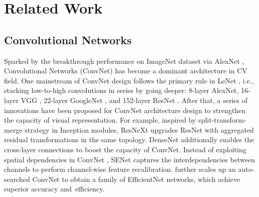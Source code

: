 \documentclass[10pt,twocolumn,letterpaper]{article}
\begin{document}
\section{Related Work}

\subsection{Convolutional Networks} Sparked by the breakthrough performance on ImageNet dataset via AlexNet \cite{krizhevsky2012imagenet}, Convolutional Networks (ConvNet) has become a dominant architecture in CV field. One mainstream of ConvNet design follows the primary rule in LeNet \cite{lecun1998gradient}, i.e., stacking low-to-high convolutions in series by going deeper: 8-layer AlexNet, 16-layer VGG \cite{simonyan2014very}, 22-layer GoogleNet \cite{szegedy2015going}, and 152-layer ResNet \cite{he2016deep}. After that, a series of innovations have been proposed for ConvNet architecture design to strengthen the capacity of visual representation. For example, inspired by split-transform-merge strategy in Inception modules, ResNeXt \cite{xie2017aggregated} upgrades ResNet with aggregated residual transformations in the same topology.
DenseNet \cite{huang2017densely} additionally enables the cross-layer connections to boost the capacity of ConvNet.
Instead of exploiting spatial dependencies in ConvNet \cite{jaderberg2015spatial,mottaghi2014role}, SENet \cite{hu2018squeeze,hu2020squeeze} captures the interdependencies between channels to perform channel-wise feature recalibration.
\cite{tan2019efficientnet} further scales up an auto-searched ConvNet to obtain a family of EfficientNet networks, which achieve superior accuracy and~efficiency.
\end{document}
